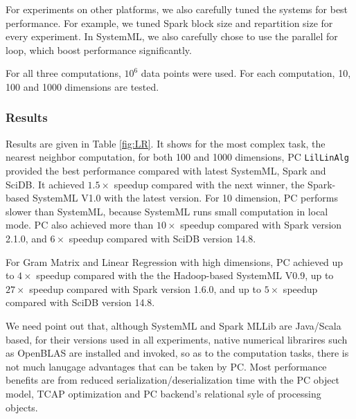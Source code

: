 For experiments on other platforms, we also carefully tuned the
systems for best performance. For example, we tuned Spark block size and repartition
size for every experiment. In SystemML, we also carefully chose to
use the parallel for loop, which boost performance significantly.

For
all three computations, 
$10^6$ data points were used. For each computation, 10, 100 and 1000
dimensions are tested.


\subsubsection {Results}

Results are given in 
Table \ref{fig:LR}. It shows for the most complex task, the nearest
neighbor computation, for both 100 and 1000 dimensions, PC
\texttt{LilLinAlg} provided the best performance compared with latest
SystemML, Spark and SciDB. It achieved $1.5\times$ speedup compared with
the next winner, the Spark-based
SystemML V1.0 with the latest version. For 10 dimension, PC performs slower
than SystemML, because SystemML runs small computation in local
mode. PC also achieved more than $10\times$ speedup compared with
Spark version 2.1.0, and $6\times$ speedup compared with SciDB version
14.8. 

For Gram Matrix and Linear Regression with high dimensions, PC achieved up to
$4\times$ speedup compared with the the Hadoop-based SystemML V0.9, up to $27\times$
speedup compared with Spark version 1.6.0, and up to $5\times$ speedup compared
with SciDB version 14.8.

We need point out that, although SystemML and Spark MLLib are
Java/Scala based, for their versions used
in all experiments, native
numerical librarires such as OpenBLAS are installed and invoked, so as to
the computation tasks, there is not much lanugage advantages that can
be taken by PC. Most performance benefits are from reduced
serialization/deserialization time with the PC object model, TCAP optimization and PC
backend's relational syle of processing objects.


